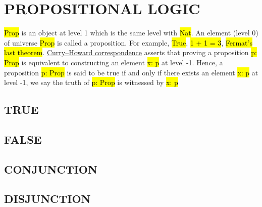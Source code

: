 \chapter{PROPOSITIONAL LOGIC}

\hl{Prop} is an object at level 1 which is the same level with \hl{Nat}. An element (level 0) of universe \hl{Prop} is called a proposition. For example, \hl{True}, \hl{1 + 1 = 3}, \hl{Fermat's last theorem}. \href{https://en.wikipedia.org/wiki/Curry%E2%80%93Howard_correspondence}{Curry–Howard correspondence} asserts that proving a proposition \hl{p: Prop} is equivalent to constructing an element \hl{x: p} at level -1. Hence, a proposition \hl{p: Prop} is said to be true if and only if there exists an element  \hl{x: p} at level -1, we say the truth of \hl{p: Prop} is witnessed by \hl{x: p}

\section{TRUE}

\section{FALSE}

\section{CONJUNCTION}

\section{DISJUNCTION}


